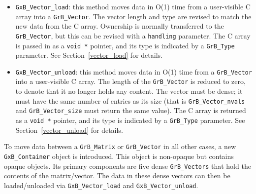\begin{itemize}

\item \verb'GxB_Vector_load':  this method moves data in O(1) time from a user-visible
    C array into a \verb'GrB_Vector'.  The vector length and type are revised
    to match the new data from the C array.  Ownership is normally transferred
    to the \verb'GrB_Vector', but this can be revised with a \verb'handling'
    parameter.  The C array is passed in as a \verb'void *' pointer, and its
    type is indicated by a \verb'GrB_Type' parameter.  See
    Section~\ref{vector_load} for details.

\item \verb'GxB_Vector_unload': this method moves data in O(1) time from a
    \verb'GrB_Vector' into a user-visible C array.  The length of the
    \verb'GrB_Vector' is reduced to zero, to denote that it no longer holds any
    content.  The vector must be dense; it must have the same number of entries
    as its size (that is \verb'GrB_Vector_nvals' and \verb'GrB_Vector_size'
    must return the same value).  The C array is returned as a \verb'void *'
    pointer, and its type is indicated by a \verb'GrB_Type' parameter.  See
    Section~\ref{vector_unload} for details.

\end{itemize}

To move data between a \verb'GrB_Matrix' or \verb'GrB_Vector' in all other
cases, a new \verb'GxB_Container' object is introduced.  This object is
non-opaque but contains opaque objects.  Its primary components are five dense
\verb'GrB_Vectors' that hold the contents of the matrix/vector.  The data in
these dense vectors can then be loaded/unloaded via \verb'GxB_Vector_load' and
\verb'GxB_Vector_unload'.

